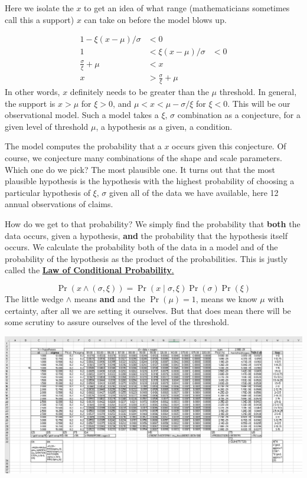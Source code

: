 \documentclass[
]{book}
\begin{document}
Here we isolate the \(x\) to get an idea of what range (mathematicians sometimes call this a support) \(x\) can take on before the model blows up.

\[
\begin{align}
1 - \xi (x-\mu) / \sigma &< 0 \\
1 &< \xi (x-\mu) / \sigma &< 0 \\
\frac{\sigma}{\xi} + \mu &< x \\
x &> \frac{\sigma}{\xi} + \mu
\end{align}
\]
In other words, \(x\) definitely needs to be greater than the \(\mu\) threshold. In general, the support is \(x>\mu\) for \(\xi>0\), and \(\mu < x < \mu-\sigma / \xi\) for \(\xi<0\). This will be our observational model. Such a model takes a \(\xi,\,\sigma\) combination as a conjecture, for a given level of threshold \(\mu\), a hypothesis as a given, a condition.

The model computes the probability that a \(x\) occurs given this conjecture. Of course, we conjecture many combinations of the shape and scale parameters. Which one do we pick? The most plausible one. It turns out that the most plausible hypothesis is the hypothesis with the highest probability of choosing a particular hypothesis of \(\xi,\,\sigma\) given all of the data we have available, here 12 annual observations of claims.

How do we get to that probability? We simply find the probability that \textbf{both} the data occurs, given a hypothesis, \textbf{and} the probability that the hypothesis itself occurs. We calculate the probability both of the data in a model and of the probability of the hypothesis as the product of the probabilities. This is justly called the \href{https://en.wikipedia.org/wiki/Conditional_probability}{\textbf{Law of Conditional Probability}.}

\[
\operatorname{Pr}(x \wedge (\sigma, \xi)) = \operatorname{Pr}(x \mid \sigma, \xi)\operatorname{Pr}(\sigma)\operatorname{Pr}(\xi)
\]
The little wedge \(\wedge\) means \textbf{and} and the \(\operatorname{Pr}(\mu) = 1\), means we know \(\mu\) with certainty, after all we are setting it ourselves. But that does mean there will be some scrutiny to assure ourselves of the level of the threshold.

\includegraphics{images/06/claims-grid-approximation-xi-sigma.jpg}
\end{document}
